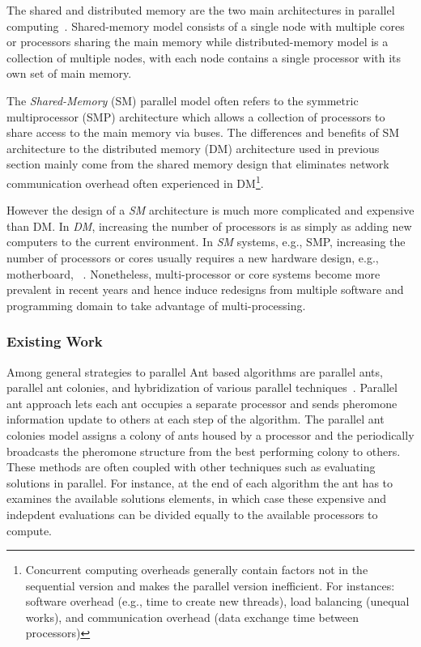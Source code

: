 \documentclass[11pt]{article}
\begin{document}
The shared and distributed memory are the two main architectures in parallel computing~\cite{}.  Shared-memory model consists of a single node with multiple cores or processors sharing  the main memory while distributed-memory model is a collection of multiple nodes, with each node contains a single processor with its own set of main memory. %



The \textit{Shared-Memory} (SM) parallel model often refers to the symmetric multiprocessor (SMP) architecture which allows a collection of processors to share access to the main memory via buses. The differences and benefits of SM architecture to the distributed memory (DM) architecture used in previous section mainly come from the shared memory design that eliminates network communication overhead often experienced in DM\footnote{Concurrent computing overheads generally contain factors not in the sequential version and makes the parallel version inefficient. For instances: software overhead (e.g., time to create new threads), load balancing (unequal works), and communication overhead (data exchange time between processors)}. 

However the design of a \textit{SM} architecture is much more complicated and expensive than DM. In \textit{DM}, increasing the number of processors is as simply as adding new computers to the current environment. In \textit{SM} systems, e.g., SMP, increasing the number of processors or cores usually requires a new hardware design, e.g., motherboard, ~\cite{Hi}.  Nonetheless, multi-processor or core systems become more prevalent in recent years and hence induce redesigns from multiple software and programming domain to take advantage of multi-processing.


\subsubsection{Existing Work}

Among general strategies to parallel Ant based algorithms are parallel ants, parallel ant colonies, and hybridization of various parallel techniques~\cite{TRFR,RL}.  Parallel ant approach lets each ant occupies a separate processor and sends pheromone information update to others at each step of the algorithm. The parallel ant colonies model assigns a colony of ants housed by a processor and the periodically broadcasts the pheromone structure from the best performing colony to others.  These methods are often coupled with other techniques such as evaluating solutions in parallel. For instance, at the end of each algorithm the ant has to examines the available solutions elements, in which case these expensive and indepdent evaluations can be divided equally to the available processors to compute.
\end{document}
